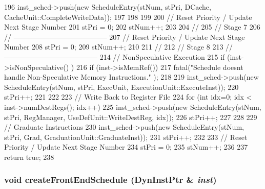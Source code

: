 \begin{DoxyCode}
{{{196             inst_sched->push(new ScheduleEntry(stNum, stPri, DCache, 
      CacheUnit::CompleteWriteData));
197         }
198     }
199 
200     // Reset Priority / Update Next Stage Number
201     stPri = 0;
202     stNum++;
203 
204     //
205     // Stage 7
206     // ---------------------------------------
207     // Reset Priority / Update Next Stage Number
208     stPri = 0;
209     stNum++;
210 
211     //
212     // Stage 8
213     // ---------------------------------------
214     // NonSpeculative Execution
215     if (inst->isNonSpeculative() ) {
216         if (inst->isMemRef())
217             fatal("Schedule doesnt handle Non-Speculative Memory Instructions.\n"
      );
218 
219         inst_sched->push(new ScheduleEntry(stNum, stPri, ExecUnit, 
      ExecutionUnit::ExecuteInst));
220         stPri++;
221     }
222 
223     // Write Back to Register File
224     for (int idx=0; idx < inst->numDestRegs(); idx++) {
225         inst_sched->push(new ScheduleEntry(stNum, stPri, RegManager, 
      UseDefUnit::WriteDestReg, idx));
226         stPri++;
227     }
228 
229     // Graduate Instructions
230     inst_sched->push(new ScheduleEntry(stNum, stPri, Grad, 
      GraduationUnit::GraduateInst));
231     stPri++;
232 
233     // Reset Priority / Update Next Stage Number
234     stPri = 0;
235     stNum++;
236 
237     return true;
238 }
\end{DoxyCode}
\hypertarget{namespaceThePipeline_a47c8cbd46bfdf2ebcec1d556e7bcea01}{
\subsubsection[{createFrontEndSchedule}]{\setlength{\rightskip}{0pt plus 5cm}void createFrontEndSchedule (DynInstPtr \& {\em inst})}}
\label{namespaceThePipeline_a47c8cbd46bfdf2ebcec1d556e7bcea01}



